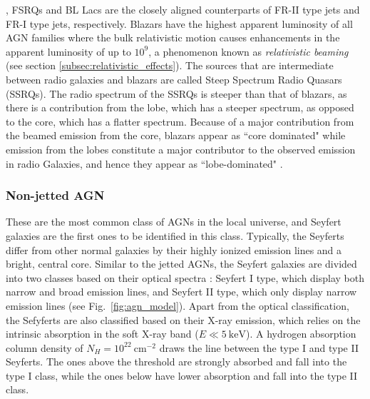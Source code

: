 \citep[e.g.,][]{urry1995unified}, FSRQs and BL Lacs are the closely aligned counterparts of FR-II type jets and FR-I type jets, respectively. Blazars have the highest apparent luminosity of all AGN families where the bulk relativistic motion causes enhancements in the apparent luminosity of up to $10^9$, a phenomenon known as \textit{relativistic beaming} (see section \ref{subsec:relativistic_effects}). The sources that are intermediate between radio galaxies and blazars are called Steep Spectrum Radio Quasars (SSRQs). The radio spectrum of the SSRQs is steeper than that of blazars, as there is a contribution from the lobe, which has a steeper spectrum, as opposed to the core, which has a flatter spectrum. Because of a major contribution from the beamed emission from the core, blazars appear as ``core dominated" while emission from the lobes constitute a major contributor to the observed emission in radio Galaxies, and hence they appear as ``lobe-dominated" \citep{1997iagn.book.....P}.



\subsubsection{Non-jetted AGN}
These are the most common class of AGNs in the local universe, and Seyfert galaxies \citep{seyfert1943nuclear} are the first ones to be identified in this class. Typically, the Seyferts differ from other normal galaxies by their highly ionized emission lines and a bright, central core. Similar to the jetted AGNs, the Seyfert galaxies are divided into two classes based on their optical spectra \citep{khachikian1974atlas}: Seyfert I type, which display both narrow and broad emission lines, and Seyfert II type, which only display narrow emission lines (see Fig.~\ref{fig:agn_model}). Apart from the optical classification, the Sefyferts are also classified based on their X-ray emission, which relies on the intrinsic absorption in the soft X-ray band ($E\ll 5~\text{keV}$). A hydrogen absorption column density of $N_H=10^{22}~\text{cm}^{-2}$ draws the line between the type I and type II Seyferts. The ones above the threshold are strongly absorbed and fall into the type I class, while the ones below have lower absorption and fall into the type II class. 

